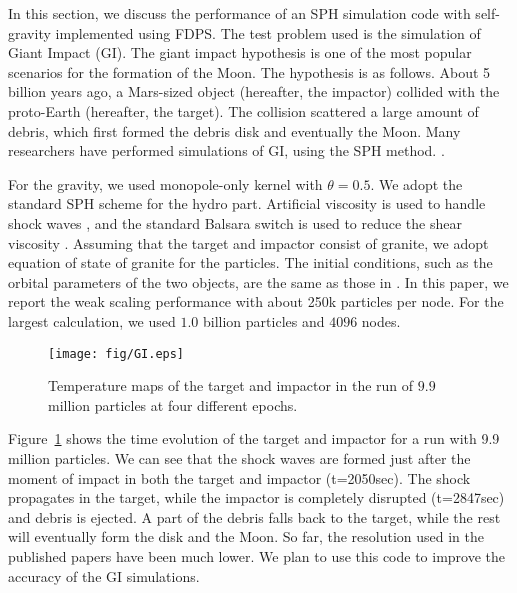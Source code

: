 In this section, we discuss the performance of an SPH simulation code
with self-gravity implemented using FDPS. The test problem used is the
simulation of Giant Impact (GI). The giant impact
hypothesis \cite{1975Icar...24..504H, 1976LPI.....7..120C} is one of
the most popular scenarios for the formation of the Moon. The
hypothesis is as follows. About 5 billion years ago, a Mars-sized
object (hereafter, the impactor) collided with the proto-Earth
(hereafter, the target). The collision scattered a large amount of
debris, which first formed the debris disk and eventually the
Moon. Many researchers have performed simulations of GI, using the SPH
method.
\cite{1986Icar...66..515B, 2013Icar..222..200C, 2014NatGe...7..564A}.

For the gravity, we used monopole-only kernel with $\theta=0.5$. We
adopt the standard SPH scheme
\cite{1992ARA&A..30..543M, 2009NewAR..53...78R, 2010ARA&A..48..391S}
for the hydro part. Artificial viscosity is used to handle shock waves
\cite{1997JCoPh.136..298M}, and 
the standard Balsara switch is used to reduce the shear viscosity
\cite{1995JCoPh.121..357B}. Assuming that the target and impactor
consist of granite, we adopt equation of state of
granite \cite{1986Icar...66..515B} for the particles. The initial
conditions, such as the orbital parameters of the two objects, are the
same as those in \cite{1986Icar...66..515B}. In this paper, we report
the weak scaling performance with about 250k particles per node. For
the largest calculation, we used $1.0$ billion particles and $4096$
nodes.

\begin{figure}
  \begin{center}
    \texttt{[image: fig/GI.eps]}
  \end{center}
  \caption{Temperature maps of the target and impactor in the run of
  $9.9$ million particles at four different epochs. }
  \label{fig:evolutionGI}
\end{figure}

Figure~\ref{fig:evolutionGI} shows the time evolution of the target
and impactor for a run with 9.9 million particles. We can see that the shock waves
are formed just after the moment of impact in both the target and
impactor (t=2050sec). The shock propagates in the target, while the
impactor is completely disrupted (t=2847sec) and debris is ejected. A
part of the debris falls back to the target, while the rest will
eventually form the disk and the Moon. So far, the resolution used in
the published papers have been much lower. We plan to use this code to
improve the accuracy of the GI simulations.


